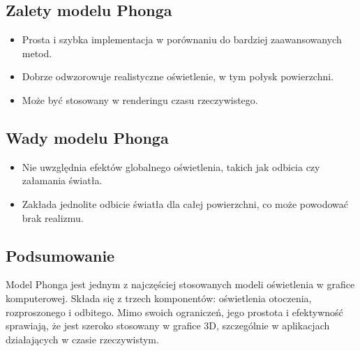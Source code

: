 \subsection{Zalety modelu Phonga}
\begin{itemize}
    \item Prosta i szybka implementacja w porównaniu do bardziej zaawansowanych metod.
    \item Dobrze odwzorowuje realistyczne oświetlenie, w tym połysk powierzchni.
    \item Może być stosowany w renderingu czasu rzeczywistego.
\end{itemize}

\subsection{Wady modelu Phonga}
\begin{itemize}
    \item Nie uwzględnia efektów globalnego oświetlenia, takich jak odbicia czy załamania światła.
    \item Zakłada jednolite odbicie światła dla całej powierzchni, co może powodować brak realizmu.
\end{itemize}

\subsection{Podsumowanie}
Model Phonga jest jednym z najczęściej stosowanych modeli oświetlenia w grafice komputerowej. Składa się z trzech komponentów: oświetlenia otoczenia, rozproszonego i odbitego. Mimo swoich ograniczeń, jego prostota i efektywność sprawiają, że jest szeroko stosowany w grafice 3D, szczególnie w aplikacjach działających w czasie rzeczywistym.

